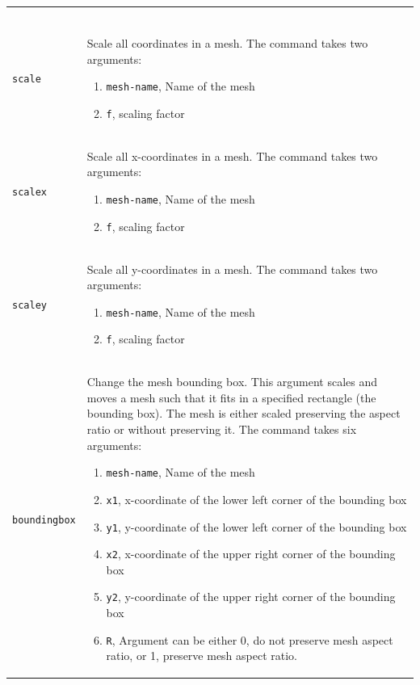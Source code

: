 \documentclass[noshowpacs,preprintnumbers,amsmath,amssymb, letter]{revtex4}
\begin{document}
\begin{longtable}{p{}p{}}
\begin{enumerate}
\end{enumerate}\\
\texttt{scale} 	& Scale all coordinates in a mesh. The command takes two arguments:
\begin{enumerate}
\item \texttt{mesh-name}, Name of the mesh
\item \texttt{f}, scaling factor
\end{enumerate}\\
\texttt{scalex} 	& Scale all x-coordinates in a mesh. The command takes two arguments:
\begin{enumerate}
\item \texttt{mesh-name}, Name of the mesh
\item \texttt{f}, scaling factor
\end{enumerate}\\
\texttt{scaley} 	& Scale all y-coordinates in a mesh. The command takes two arguments:
\begin{enumerate}
\item \texttt{mesh-name}, Name of the mesh
\item \texttt{f}, scaling factor
\end{enumerate}\\
\texttt{boundingbox} 	& Change the mesh bounding box. This argument scales and moves a mesh such that it fits in a specified rectangle (the bounding box). The mesh is either scaled preserving the aspect ratio or without preserving it. The command takes six arguments:
\begin{enumerate}
\item \texttt{mesh-name}, Name of the mesh
\item \texttt{x1}, x-coordinate of the lower left corner of the bounding box
\item \texttt{y1}, y-coordinate of the lower left corner of the bounding box
\item \texttt{x2}, x-coordinate of the upper right corner of the bounding box
\item \texttt{y2}, y-coordinate of the upper right corner of the bounding box
\item \texttt{R}, Argument can be either 0, do not preserve mesh aspect ratio, or 1, preserve mesh aspect ratio. 

\end{enumerate}
\end{longtable}
\end{document}
